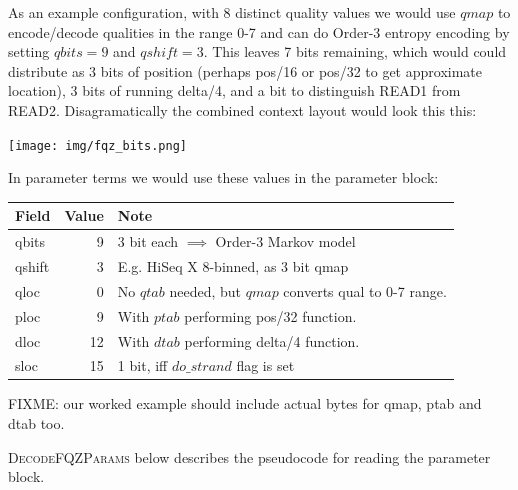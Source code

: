 \documentclass[a4paper]{article}
\begin{document}
As an example configuration, with 8 distinct quality values we would
use $qmap$ to encode/decode qualities in the range 0-7 and can do
Order-3 entropy encoding by setting $qbits=9$ and $qshift=3$.  This
leaves 7 bits remaining, which would could distribute as 3 bits of
position (perhaps pos/16 or pos/32 to get approximate location), 3
bits of running delta/4, and a bit to distinguish READ1 from READ2.
Disagramatically the combined context layout would look this this:

\texttt{[image: img/fqz\_bits.png]}

In parameter terms we would use these values in the parameter block:

\begin{tabular}{lrl}
\hline
\textbf{Field} & \textbf{Value} & \textbf{Note}\\
\hline
qbits  & 9  & 3 bit each $\implies$ Order-3 Markov model \\
qshift & 3  & E.g. HiSeq X 8-binned, as 3 bit qmap \\
qloc   & 0  & No $qtab$ needed, but $qmap$ converts qual to 0-7 range.\\
\hline
ploc   & 9  & With $ptab$ performing pos/32 function.\\
\hline
dloc   & 12 & With $dtab$ performing delta/4 function.\\
\hline
sloc   & 15 & 1 bit, iff $do\_strand$ flag is set\\
\hline
\end{tabular}

FIXME: our worked example should include actual bytes for qmap, ptab
and dtab too.


\textsc{DecodeFQZParams} below describes the pseudocode for reading
the parameter block.
\end{document}
